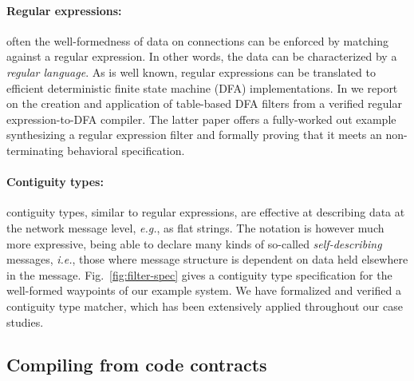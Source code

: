 \documentclass[global,twocolumn]{svjour}
\newcommand{\figref}[1]{Fig.~\ref{#1}}
\newcommand{\ie}{\textit{i.e.}}
\newcommand{\eg}{\textit{e.g.}}
\begin{document}
\paragraph{Regular expressions:\/} often the well-formedness of data on connections can be enforced by matching against a regular expression.
%
In other words, the data can be characterized by a \emph{regular language}.
%
As is well known, regular expressions can be translated to efficient deterministic finite state machine (DFA) implementations.
%
In \cite{formal-filter-synth-langsec,case-verified-filter} we report on the creation and application of table-based DFA filters from a verified regular expression-to-DFA compiler.
%
The latter paper offers a fully-worked out example synthesizing a regular expression filter and formally proving that it meets an non-terminating behavioral specification.

\paragraph{Contiguity types\cite{contiguity-types}:\/} contiguity types, similar to regular expressions, are effective at describing data at the network message level, \eg, as flat strings.
%
The notation is however much more expressive, being able to declare many kinds of so-called \emph{self-describing} messages, \ie, those where message structure is dependent on data held elsewhere in the message.
%
\figref{fig:filter-spec} gives a contiguity type specification for the well-formed waypoints of our example system.
%
We have formalized and verified a contiguity type matcher, which has been extensively applied throughout our case studies.


\subsection{Compiling from code contracts}
\end{document}
